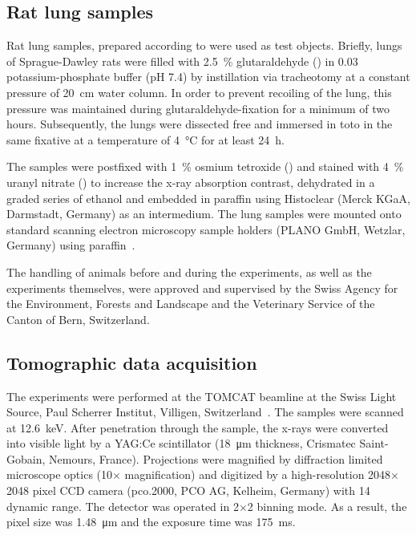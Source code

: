 \documentclass[%
	paper=a4,%
	DIV=calc,%
	twoside=true,%
	draft=true,%
	abstract=false]{scrartcl}
\begin{document}
\subsection{Rat lung samples}
Rat lung samples, prepared according to \cite{Tschanz2002,Luyet2002} were used as test objects. Briefly, lungs of Sprague-Dawley rats were filled with \SI{2.5}{\percent} glutaraldehyde () in \SI{0.03}{\Molar} potassium-phosphate buffer (pH 7.4) by instillation via tracheotomy at a constant pressure of \SI{20}{\centi\meter} water column. In order to prevent recoiling of the lung, this pressure was maintained during glutaraldehyde-fixation for a minimum of two hours. Subsequently, the lungs were dissected free and immersed in toto in the same fixative at a temperature of \SI{4}{\celsius} for at least \SI{24}{\hour}.

The samples were postfixed with \SI{1}{\percent} osmium tetroxide () and stained with \SI{4}{\percent} uranyl nitrate () to increase the x-ray absorption contrast, dehydrated in a graded series of ethanol and embedded in paraffin using Histoclear (Merck KGaA, Darmstadt, Germany) as an intermedium. The lung samples were mounted onto standard scanning electron microscopy sample holders (PLANO GmbH, Wetzlar, Germany) using paraffin~\cite{Tsuda2008}.

The handling of animals before and during the experiments, as well as the experiments themselves, were approved and supervised by the Swiss Agency for the Environment, Forests and Landscape and the Veterinary Service of the Canton of Bern, Switzerland.

\subsection{Tomographic data acquisition}
The experiments were performed at the TOMCAT beamline at the Swiss Light Source, Paul Scherrer Institut, Villigen, Switzerland~\cite{Stampanoni2006a}. The samples were scanned at \SI{12.6}{\kilo\electronvolt}. After penetration through the sample, the x-rays were converted into visible light by a YAG:Ce scintillator (\SI{18}{\micro\meter} thickness, Crismatec Saint-Gobain, Nemours, France). Projections were magnified by diffraction limited microscope optics (10\(\times\) magnification) and digitized by a high-resolution 2048\(\times\)2048 pixel CCD camera (pco.2000, PCO AG, Kelheim, Germany) with \SI{14}{\bit} dynamic range. The detector was operated in 2\(\times\)2 binning mode. As a result, the pixel size was \SI{1.48}{\micro\meter} and the exposure time was \SI{175}{\milli\second}.
\end{document}
